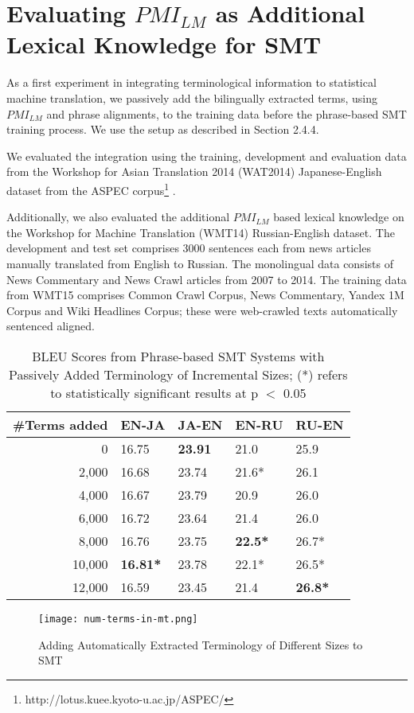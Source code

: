 \section{Evaluating $PMI_{LM}$ as Additional Lexical Knowledge for SMT}

As a first experiment in integrating terminological information to statistical machine translation, we passively add the bilingually extracted terms, using $PMI_{LM}$ and phrase alignments, to the training data before the phrase-based SMT training process. We use the setup as described in Section 2.4.4. 

We evaluated the integration using the training, development and evaluation data from the Workshop for Asian Translation 2014 (WAT2014) Japanese-English dataset \citep{nakazawa2014overview} from the ASPEC corpus\footnote{http://lotus.kuee.kyoto-u.ac.jp/ASPEC/} \citep{NAKAZAWA16.621}. 

Additionally, we also evaluated the additional $PMI_{LM}$ based lexical knowledge on the Workshop for Machine Translation (WMT14) Russian-English dataset. The development and test set comprises 3000 sentences each from news articles manually translated from English to Russian. The monolingual data consists of News Commentary and News Crawl articles from 2007 to 2014. The training data from WMT15 comprises Common Crawl Corpus, News Commentary, Yandex 1M Corpus and Wiki Headlines Corpus; these were web-crawled texts automatically sentenced aligned.

\begin{table}[H]
\centering
    \begin{tabular}{r|ll|ll}
     \textbf{\#Terms added} & \textbf{EN-JA} & \textbf{JA-EN} & \textbf{EN-RU} & \textbf{RU-EN} \\ \hline
    0                   & 16.75 & \textbf{23.91} & 21.0  & 25.9  \\
    2,000               & 16.68 & 23.74 & 21.6*  & 26.1  \\
    4,000               & 16.67 & 23.79 & 20.9  & 26.0  \\
    6,000               & 16.72 & 23.64 & 21.4  & 26.0  \\
    8,000               & 16.76 & 23.75 & \textbf{22.5*} & 26.7*  \\
    10,000              & \textbf{16.81*} & 23.78 & 22.1*  & 26.5*  \\
    12,000              & 16.59 & 23.45 & 21.4  & \textbf{26.8*}  \\
    \end{tabular}
\caption{BLEU Scores from Phrase-based SMT Systems with Passively Added Terminology of Incremental Sizes; (*) refers to statistically significant results at p $<$ 0.05}
\label{table:pmilmanal}
\end{table}
\vspace{-5mm}
\begin{figure}[!htb]
\centering
	\hspace{-2em}%
	\texttt{[image: num-terms-in-mt.png]} \\[-1em]
	\caption{Adding Automatically Extracted Terminology of Different Sizes to SMT}
	\label{fig-numterminmt}
\end{figure}


